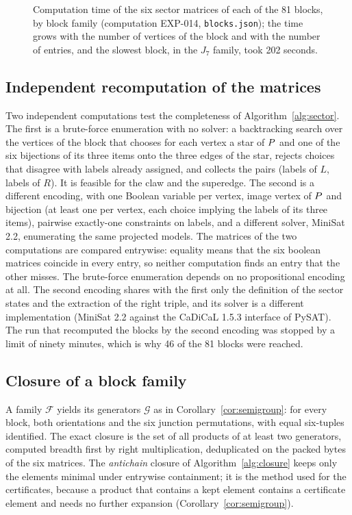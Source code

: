 \begin{figure}[t]\centering

\caption{Computation time of the six sector matrices of each of the 81 blocks, by block family (computation EXP-014, \texttt{blocks.json}); the time grows with the
number of vertices of the block and with the number of entries, and the slowest block, in the $J_7$ family, took 202 seconds.}\label{fig:blocktimes}
\end{figure}

\subsection{Independent recomputation of the matrices}\label{sec:alg-recheck}

Two independent computations test the completeness of Algorithm~\ref{alg:sector}. The first is a brute-force
enumeration with no solver: a backtracking search over the vertices of the block that chooses for each vertex a star of $P$ and one of the
six bijections of its three items onto the three edges of the star, rejects choices that disagree with labels already
assigned, and collects the pairs (labels of $L$, labels of $R$). It is feasible for the claw and the superedge. The second
is a different encoding, with one Boolean variable per vertex, image vertex of $P$ and bijection (at least one per vertex,
each choice implying the labels of its three items), pairwise exactly-one constraints on labels, and a different
solver, MiniSat 2.2, enumerating the same projected models. The matrices of the two computations are compared entrywise: equality means that the six boolean matrices coincide
in every entry, so neither computation finds an entry that the other misses. The brute-force enumeration depends on no propositional encoding at all.
The second encoding shares with the first only the definition of the sector states and the extraction of the right triple, and its solver is a different implementation
(MiniSat 2.2 against the CaDiCaL 1.5.3 interface of PySAT). The run that recomputed the blocks by the second encoding was stopped by a limit of ninety minutes, which is why
46 of the 81 blocks were reached.

\subsection{Closure of a block family}\label{sec:alg-closure}

A family $\mathcal{F}$ yields its generators $\mathcal{G}$ as in Corollary~\ref{cor:semigroup}: for every block, both orientations and the
six junction permutations, with equal six-tuples identified. The exact closure is the set of all products of at least
two generators, computed breadth first by right multiplication, deduplicated on the packed bytes of the six matrices.
The \emph{antichain} closure of Algorithm~\ref{alg:closure} keeps only the elements minimal under entrywise containment;
it is the method used for the certificates, because a product that contains a kept element contains a certificate element
and needs no further expansion (Corollary~\ref{cor:semigroup}).

